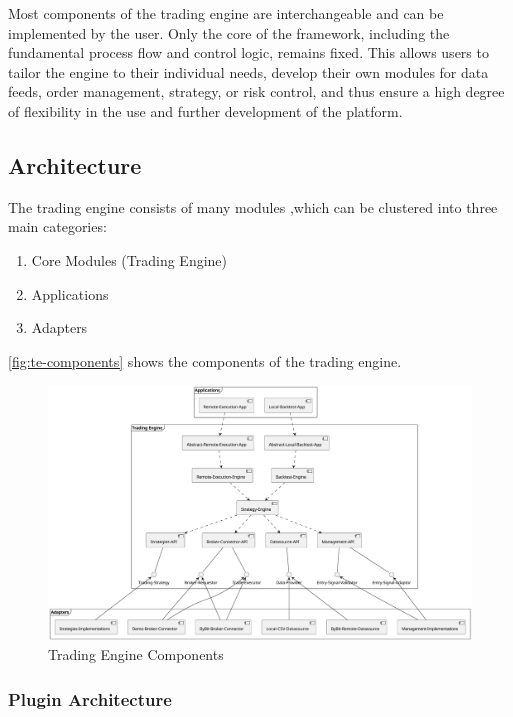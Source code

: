 \noindent
Most components of the trading engine are interchangeable and can be implemented by the user.
Only the core of the framework, including the fundamental process flow and control logic, remains fixed.
This allows users to tailor the engine to their individual needs, develop their own modules for data feeds, order management, strategy, or risk control, and thus ensure a high degree of flexibility in the use and further development of the platform.

\subsection{Architecture}

The trading engine consists of many modules ,which can be clustered into three main categories:

\begin{enumerate}
    \item Core Modules (Trading Engine)
    \item Applications
    \item Adapters
\end{enumerate}

\noindent
\autoref{fig:te-components} shows the components of the trading engine.

\begin{figure}[H]
    \centering
    \includegraphics[width=\textwidth]{images/trading-engine/trading-engine-components}
    \caption{Trading Engine Components}
    \label{fig:te-components}
\end{figure}

\subsubsection{Plugin Architecture}

